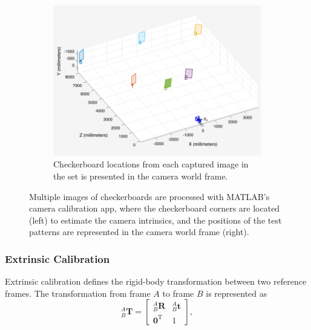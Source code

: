 \documentclass{erauthesis}
\begin{document}
\begin{figure}[htbp]
{\begin{subfigure}[t]{0.625\textwidth}
        \includegraphics[width=\textwidth]{Images/cam_calib_2.png}
        \caption{Checkerboard locations from each captured image in the set is presented in the camera world frame.}
        \label{fig:cam_calib_2}
    \end{subfigure}%
}
\caption{Multiple images of checkerboards are processed with MATLAB's camera calibration app, where the checkerboard corners are located (left) to estimate the camera intrinsics, and the positions of the test patterns are represented in the camera world frame (right).}
\label{fig:cam_calib}
\end{figure}

\subsubsection{Extrinsic Calibration} \label{extrinsic_tform}


Extrinsic calibration defines the rigid-body transformation between two reference frames.
The transformation from frame $A$ to frame $B$ is represented as
\begin{equation}
    _{B}^{A}\mathbf{T} =
    \begin{bmatrix}
        _{B}^{A}\mathbf{R} & _{B}^{A}\mathbf{t} \\
        \mathbf{0}^\mathrm{T} & 1
    \end{bmatrix},
\end{equation}
\end{document}
